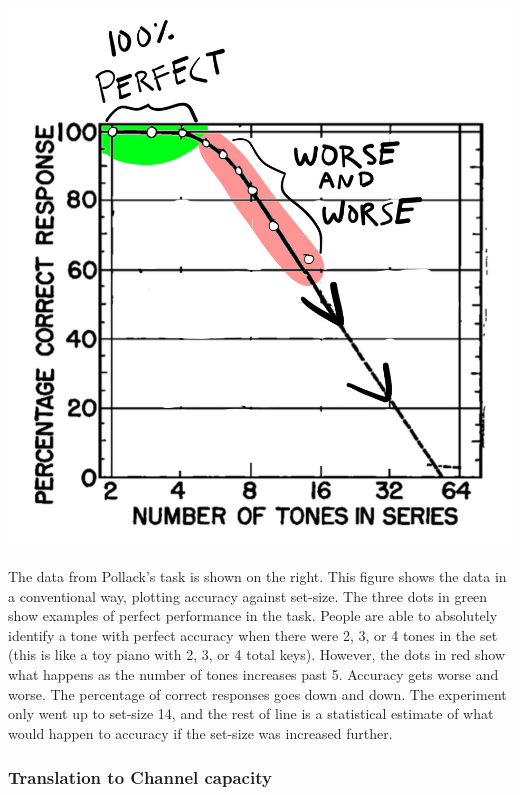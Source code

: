 \documentclass[
  oneside,
  12pt]{crumpbook}
\newenvironment{floatright50}{%
  \wrapfigure{R}{.5\textwidth}%
  }{%
  \endwrapfigure}
\begin{document}
\begin{floatright50}
\includegraphics[width=1\linewidth]{imgs/Pollack_tone}

\end{floatright50}

The data from Pollack's task is shown on the right. This figure shows the data in a conventional way, plotting accuracy against set-size. The three dots in green show examples of perfect performance in the task. People are able to absolutely identify a tone with perfect accuracy when there were 2, 3, or 4 tones in the set (this is like a toy piano with 2, 3, or 4 total keys). However, the dots in red show what happens as the number of tones increases past 5. Accuracy gets worse and worse. The percentage of correct responses goes down and down. The experiment only went up to set-size 14, and the rest of line is a statistical estimate of what would happen to accuracy if the set-size was increased further.

\hypertarget{translation-to-channel-capacity}{%
\subsubsection{Translation to Channel capacity}\label{translation-to-channel-capacity}}
\end{document}
